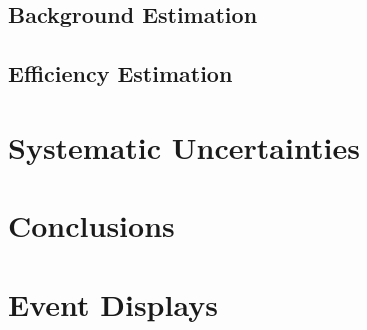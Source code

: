 \documentclass[letterpaper,12pt]{article}
\begin{document}
\subsection{Background Estimation}

\subsection{Efficiency Estimation}

\section{Systematic Uncertainties}

\section{Conclusions}

\appendix
\section{Event Displays}

\lstset{%
    basicstyle=\scriptsize\ttfamily,
    breaklines=true
}
\end{document}
